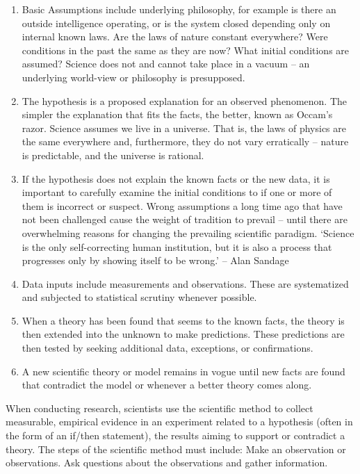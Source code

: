 \begin{enumerate}
\item Basic Assumptions include underlying philosophy, for example is there an outside intelligence operating, or is the system closed depending only on internal known laws. Are the laws of nature constant everywhere?  Were conditions in the past the same as they are now?  What initial conditions are assumed?  Science does not and cannot take place in a vacuum – an underlying world-view or philosophy is presupposed.
\item The hypothesis is a proposed explanation for an observed phenomenon. The simpler the explanation that fits the facts, the better, known as Occam’s razor. Science assumes we live in a universe. That is, the laws of physics are the same everywhere and, furthermore, they do not vary erratically – nature is predictable, and the universe is rational.
\item If the hypothesis does not explain the known facts or the new data, it is important to carefully examine the initial conditions to if one or more of them is incorrect or suspect. Wrong assumptions a long time ago that have not been challenged cause the weight of tradition to prevail – until there are overwhelming reasons for changing the prevailing scientific paradigm.
‘Science is the only self-correcting human institution, but it is also a process that progresses only by showing itself to be wrong.’ – Alan Sandage
\item Data inputs include measurements and observations. These are systematized and subjected to statistical scrutiny whenever possible.
\item When a theory has been found that seems to the known facts, the theory is then extended into the unknown to make predictions. These predictions are then tested by seeking additional data, exceptions, or confirmations.
\item A new scientific theory or model remains in vogue until new facts are found that contradict the model or whenever a better theory comes along.
\end{enumerate}

When conducting research, scientists use the scientific method to collect measurable, empirical evidence in an experiment related to a hypothesis (often in the form of an if/then statement), the results aiming to support or contradict a theory.
The steps of the scientific method must include: 
Make an observation or observations.
Ask questions about the observations and gather information.

